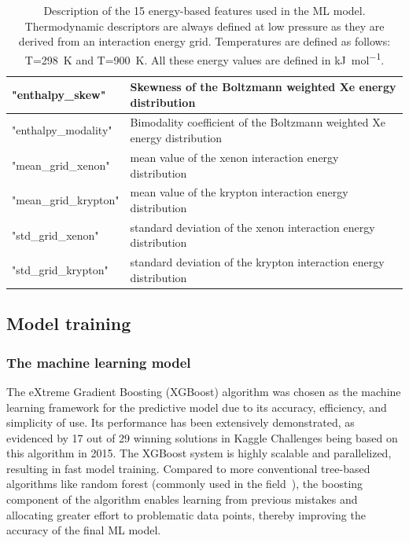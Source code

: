 \documentclass[main]{subfiles}
\begin{document}
\begin{table}[ht]
\begin{tabular}{|l|m{10.3cm}|}
  \hline
  "enthalpy\_skew"  & Skewness of the Boltzmann weighted Xe energy distribution \\
  \hline
  "enthalpy\_modality"  & Bimodality coefficient of the Boltzmann weighted Xe energy distribution \\
  \hline
  "mean\_grid\_xenon"  & mean value of the xenon interaction energy distribution \\
  \hline
  "mean\_grid\_krypton"  & mean value of the krypton interaction energy distribution \\
  \hline
  "std\_grid\_xenon"  & standard deviation of the xenon interaction energy distribution \\
  \hline
  "std\_grid\_krypton"  & standard deviation of the krypton interaction energy distribution \\
  \hline
  \end{tabular}
  \caption{Description of the 15 energy-based features used in the ML model. Thermodynamic descriptors are always defined at low pressure as they are derived from an interaction energy grid. Temperatures are defined as follows: T=298~\si{\kelvin} and T=900~\si{\kelvin}. All these energy values are defined in \si{\kilo\joule\per\mole}.}\label{tab:energy_descriptors}
  \end{table}
  
  \clearpage

\subsection{Model training}

\subsubsection{The machine learning model}

The eXtreme Gradient Boosting (XGBoost) algorithm was chosen as the machine learning framework for the predictive model due to its accuracy, efficiency, and simplicity of use. Its performance has been extensively demonstrated, as evidenced by 17 out of 29 winning solutions in Kaggle Challenges being based on this algorithm in 2015. The XGBoost system is highly scalable and parallelized, resulting in fast model training.\autocite{chen2016xgboost} Compared to more conventional tree-based algorithms like random forest (commonly used in the field~\autocite{Simon_2015}), the boosting component of the algorithm enables learning from previous mistakes and allocating greater effort to problematic data points, thereby improving the accuracy of the final ML model.
\end{document}

